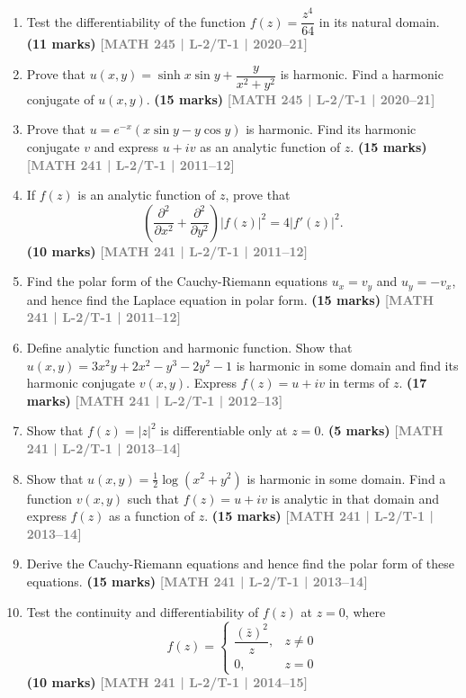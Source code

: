 \documentclass[12pt,a4paper]{article}
\newcommand{\yr}[1]{\hfill\textcolor{gray}{\small\textbf{[#1]}}}
\newcommand{\mk}[1]{\textcolor{orange!70!black}{\small\textbf{(#1 marks)}}}
\begin{document}
\begin{enumerate}

\item Test the differentiability of the function $f(z)=\dfrac{z^{4}}{64}$ in its natural domain.
\mk{11} \yr{MATH 245 | L-2/T-1 | 2020--21}

\item Prove that $u(x,y)=\sinh x\sin y+\dfrac{y}{x^{2}+y^{2}}$ is harmonic. Find a harmonic conjugate of $u(x,y)$.
\mk{15} \yr{MATH 245 | L-2/T-1 | 2020--21}

\item Prove that $u = e^{-x}(x\sin y - y\cos y)$ is harmonic. Find its harmonic conjugate $v$ and express $u+iv$ as an analytic function of $z$.
\mk{15} \yr{MATH 241 | L-2/T-1 | 2011--12}

\item If $f(z)$ is an analytic function of $z$, prove that
\[
\left(\frac{\partial^{2}}{\partial x^{2}}+\frac{\partial^{2}}{\partial y^{2}}\right)|f(z)|^{2} = 4|f'(z)|^{2}.
\]
\mk{10} \yr{MATH 241 | L-2/T-1 | 2011--12}

\item Find the polar form of the Cauchy-Riemann equations $u_{x}=v_{y}$ and $u_{y}=-v_{x}$, and hence find the Laplace equation in polar form.
\mk{15} \yr{MATH 241 | L-2/T-1 | 2011--12}

\item Define analytic function and harmonic function. Show that $u(x,y)=3x^{2}y+2x^{2}-y^{3}-2y^{2}-1$ is harmonic in some domain and find its harmonic conjugate $v(x,y)$. Express $f(z)=u+iv$ in terms of $z$.
\mk{17} \yr{MATH 241 | L-2/T-1 | 2012--13}

\item Show that $f(z)=|z|^{2}$ is differentiable only at $z=0$.
\mk{5} \yr{MATH 241 | L-2/T-1 | 2013--14}

\item Show that $u(x,y)=\tfrac{1}{2}\log(x^{2}+y^{2})$ is harmonic in some domain. Find a function $v(x,y)$ such that $f(z)=u+iv$ is analytic in that domain and express $f(z)$ as a function of $z$.
\mk{15} \yr{MATH 241 | L-2/T-1 | 2013--14}

\item Derive the Cauchy-Riemann equations and hence find the polar form of these equations.
\mk{15} \yr{MATH 241 | L-2/T-1 | 2013--14}

\item Test the continuity and differentiability of $f(z)$ at $z=0$, where
\[
f(z)=\begin{cases} \dfrac{(\bar{z})^{2}}{z}, & z\neq 0 \\ 0, & z=0 \end{cases}
\]
\mk{10} \yr{MATH 241 | L-2/T-1 | 2014--15}


\end{enumerate}
\end{document}
